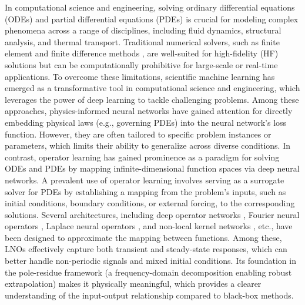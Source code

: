 
In computational science and engineering, solving ordinary differential equations (ODEs) and partial differential equations (PDEs) is crucial for modeling complex phenomena across a range of disciplines, including fluid dynamics, structural analysis, and thermal transport. Traditional numerical solvers, such as finite element \citep{hughes2003finite} and finite difference methods \citep{leveque2007finite}, are well-suited for high-fidelity (HF) solutions but can be computationally prohibitive for large-scale or real-time applications. To overcome these limitations, scientific machine learning has emerged as a transformative tool in computational science and engineering, which leverages the power of deep learning to tackle challenging problems. Among these approaches, physics-informed neural networks \citep{raissi2019physics,karniadakis2021physics} have gained attention for directly embedding physical laws (e.g., governing PDEs) into the neural network's loss function. However, they are often tailored to specific problem instances or parameters, which limits their ability to generalize across diverse conditions. In contrast, operator learning has gained prominence as a paradigm for solving ODEs and PDEs by mapping infinite-dimensional function spaces via deep neural networks. A prevalent use of operator learning involves serving as a surrogate solver for PDEs by establishing a mapping from the problem's inputs, such as initial conditions, boundary conditions, or external forcing, to the corresponding solutions. Several architectures, including deep operator networks \citep{lu2021learning, lu2021deepxde}, Fourier neural operators \citep{li2020fourier, kovachki2023neural}, Laplace neural operators \citep{cao2024laplace}, and non-local kernel networks \citep{you2022nonlocal}, etc., have been designed to approximate the mapping between functions. Among these, LNOs effectively capture both transient and steady-state responses, which can better handle non-periodic signals and mixed initial conditions. Its foundation in the pole-residue framework \citep{hu2016pole} (a frequency-domain decomposition enabling robust extrapolation) makes it physically meaningful, which provides a clearer understanding of the input-output relationship compared to black-box methods.

